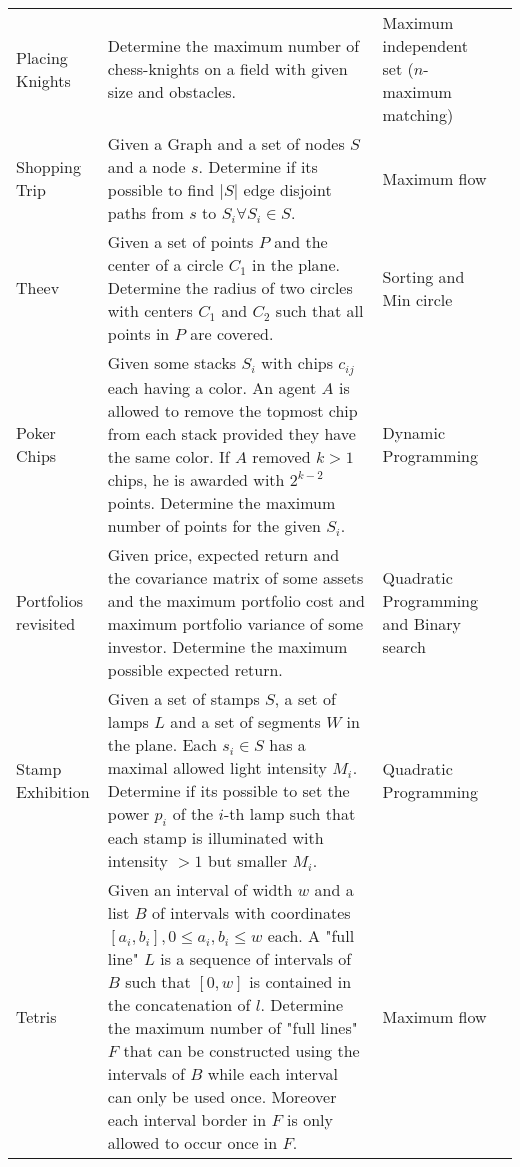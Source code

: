 \documentclass[a4paper, 10pt]{article}
\begin{document}
\begin{longtable}{ L{2cm} L{8cm} L{4cm} r}
        Placing Knights 
        & Determine the maximum number of chess-knights on a field with given size and obstacles.
        & Maximum independent set ($n$-maximum matching) &  \pageref{sec:placing_knights} \\

        Shopping Trip 
        & Given a Graph and a set of nodes $S$ and a node $s$. 
            Determine if its possible to find $|S|$ edge disjoint paths from $s$ to $S_i \forall S_i \in S$. 
        & Maximum flow &  \pageref{sec:shopping_trip} \\

        Theev 
        & Given a set of points $P$ and the center of a circle $C_1$ in the plane. Determine the radius of two circles
            with centers $C_1$ and $C_2$ such that all points in $P$ are covered.
        & Sorting and Min circle &  \pageref{sec:theev} \\

        Poker Chips 
        & Given some stacks $S_i$ with chips $c_{ij}$ each having a color. 
            An agent $A$ is allowed to remove the topmost chip from each stack provided they have the same color.
            If $A$ removed $k>1$ chips, he is awarded with $2^{k-2}$ points. 
            Determine the maximum number of points for the given $S_i$.          
            & Dynamic Programming &  \pageref{sec:poker_chips} \\

        Portfolios revisited 
        & Given price, expected return and the covariance matrix of some assets 
            and the maximum portfolio cost and maximum portfolio variance of some investor. 
            Determine the maximum possible expected return.
            & Quadratic Programming and Binary search &  \pageref{sec:portfolios_revisited} \\

        Stamp Exhibition 
        & Given a set of stamps $S$, a set of lamps $L$ and a set of segments $W$ in the plane. 
            Each $s_i\in S$ has a maximal allowed light intensity $M_i$. Determine if its possible to 
            set the power $p_i$ of the $i$-th lamp such that each stamp is illuminated with intensity $> 1$ 
            but smaller $M_i$.
        & Quadratic Programming &  \pageref{sec:stamp_exhibition} \\

        Tetris 
        & Given an interval of width $w$ and a list $B$ of intervals with coordinates $[a_i,b_i], 0\leq a_i,b_i \leq w$ each.
            A "full line" $L$ is a sequence of intervals of $B$ such that $[0,w]$ is contained in the concatenation of $l$.
            Determine the maximum number of "full lines" $F$ that can be constructed using the intervals of $B$ while each interval
            can only be used once. Moreover each interval border in $F$ is only allowed to occur once in $F$.
            & Maximum flow &  \pageref{sec:tetris} \\


\end{longtable}
\end{document}
